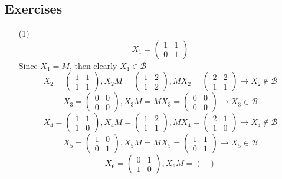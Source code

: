 \documentclass[12pt]{article}
\begin{document}
\subsection*{Exercises}
\begin{itemize}
\item[(1)]
$$X_1 = \begin{pmatrix}
1 & 1 \\
0 & 1
\end{pmatrix}$$
Since $X_1 = M$, then clearly $X_1 \in \mathcal{B}$
$$X_2 = \begin{pmatrix}
1 & 1 \\
1 & 1
\end{pmatrix}, X_2M = \begin{pmatrix}
1 & 2 \\
1 & 2
\end{pmatrix}, MX_2 = \begin{pmatrix}
2 & 2 \\
1 & 1
\end{pmatrix} \rightarrow X_2 \not \in \mathcal{B}$$
$$X_3 = \begin{pmatrix}
0 & 0 \\
0 & 0
\end{pmatrix}, X_3M = MX_3 = \begin{pmatrix}
0 & 0 \\
0 & 0
\end{pmatrix} \rightarrow X_3 \in \mathcal{B}$$
$$X_4 = \begin{pmatrix}
1 & 1 \\
1 & 0
\end{pmatrix}, X_4M = \begin{pmatrix}
1 & 2 \\
1 & 1
\end{pmatrix}, MX_4 = \begin{pmatrix}
2 & 1 \\
1 & 0
\end{pmatrix} \rightarrow X_4 \not \in \mathcal{B}$$
$$X_5 = \begin{pmatrix}
1 & 0 \\
0 & 1
\end{pmatrix}, X_5M = MX_5 = \begin{pmatrix}
1 & 1 \\
0 & 1
\end{pmatrix} \rightarrow X_5 \in \mathcal{B}$$
$$X_6 = \begin{pmatrix}
0 & 1 \\
1 & 0
\end{pmatrix}, X_6M = \begin{pmatrix}

\end{pmatrix}$$
\end{itemize}
\end{document}
